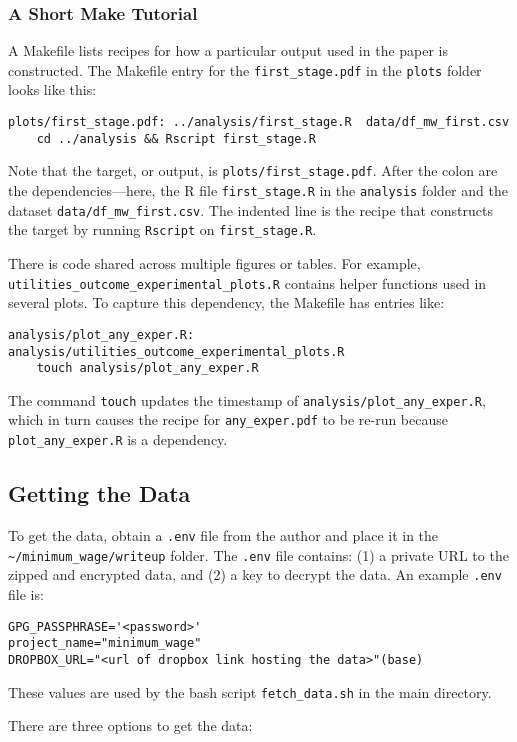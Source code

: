 \documentclass[10pt]{article}
\begin{document}
\subsubsection{A Short Make Tutorial}
A Makefile lists recipes for how a particular output used in the paper is constructed. The Makefile entry for the \texttt{first\_stage.pdf} in the \texttt{plots} folder looks like this:
\begin{verbatim}
plots/first_stage.pdf: ../analysis/first_stage.R  data/df_mw_first.csv
	cd ../analysis && Rscript first_stage.R
\end{verbatim}
Note that the target, or output, is \texttt{plots/first\_stage.pdf}. After the colon are the dependencies—here, the R file \texttt{first\_stage.R} in the \texttt{analysis} folder and the dataset \texttt{data/df\_mw\_first.csv}. The indented line is the recipe that constructs the target by running \texttt{Rscript} on \texttt{first\_stage.R}.

There is code shared across multiple figures or tables. For example, \texttt{utilities\_outcome\_experimental\_plots.R} contains helper functions used in several plots. To capture this dependency, the Makefile has entries like:
\begin{verbatim}
analysis/plot_any_exper.R: analysis/utilities_outcome_experimental_plots.R
	touch analysis/plot_any_exper.R
\end{verbatim}
The command \texttt{touch} updates the timestamp of \texttt{analysis/plot\_any\_exper.R}, which in turn causes the recipe for \texttt{any\_exper.pdf} to be re-run because \texttt{plot\_any\_exper.R} is a dependency.

\subsection{Getting the Data}

To get the data, obtain a \texttt{.env} file from the author and place it in the \texttt{\~{}/minimum\_wage/writeup} folder. The \texttt{.env} file contains: (1) a private URL to the zipped and encrypted data, and (2) a key to decrypt the data. An example \texttt{.env} file is:
\begin{verbatim}
GPG_PASSPHRASE='<password>'
project_name="minimum_wage"
DROPBOX_URL="<url of dropbox link hosting the data>"(base)
\end{verbatim}
These values are used by the bash script \texttt{fetch\_data.sh} in the main directory.

There are three options to get the data:
\end{document}
